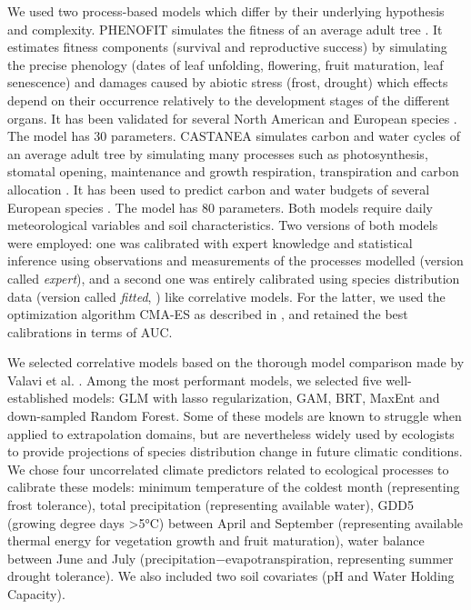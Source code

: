 \documentclass[pdflatex, sn-nature]{sn-jnl}%
\newcommand{\textappr}{\raisebox{0.5ex}{\texttildelow}} %
\begin{document}
We used two process-based models which differ by their underlying hypothesis and complexity. 
PHENOFIT simulates the fitness of an average adult tree \cite{Chuine2001}. It estimates fitness components (survival and reproductive success) by simulating the precise phenology (dates of leaf unfolding, flowering, fruit maturation, leaf senescence) and damages caused by abiotic stress (frost, drought) which effects depend on their occurrence relatively to the development stages of the different organs. It has been validated for several North American and European species \cite{Morin2007, Saltre2013, Duputie2015, Gauzere2020}. The model has \textappr30 parameters. 
CASTANEA simulates carbon and water cycles of an average adult tree by simulating many processes such as photosynthesis, stomatal opening, maintenance and growth respiration, transpiration and carbon allocation  \cite{Dufrene2005}. It has been used to predict carbon and water budgets of several European species \cite{Davi2006, Delpierre2012, Davi2017}. 
The model has \textappr80 parameters. 
Both models require daily meteorological variables and soil characteristics. 
Two versions of both models were employed: one was calibrated with expert knowledge and statistical inference using observations and measurements of the processes modelled (version called \emph{expert}), and a second one was  entirely calibrated using species distribution data (version called \emph{fitted}, \cite{VanderMeersch2023}) like correlative models. For the latter, we used the optimization algorithm CMA-ES \cite{Hansen2001} as described in \cite{VanderMeersch2023}, and retained the best calibrations in terms of AUC.
  
We selected correlative models based on the thorough model comparison made by Valavi et al. \cite{Valavi2022}. Among the most performant models, we selected five well-established models: GLM with lasso regularization, GAM, BRT, MaxEnt and down-sampled Random Forest. Some of these models are known to struggle when applied to extrapolation domains, but are nevertheless widely used by ecologists to provide projections of species distribution change in future climatic conditions.
We chose four uncorrelated climate predictors related to ecological processes to calibrate these models: minimum temperature of the coldest month (representing frost tolerance), total precipitation (representing available water), GDD5 (growing degree days  \textgreater5°C) between April and September (representing available thermal energy for vegetation growth and fruit maturation), water balance between June and July (precipitation$-$evapotranspiration, representing summer drought tolerance). We also included two soil covariates (pH and Water Holding Capacity).
  
\end{document}
